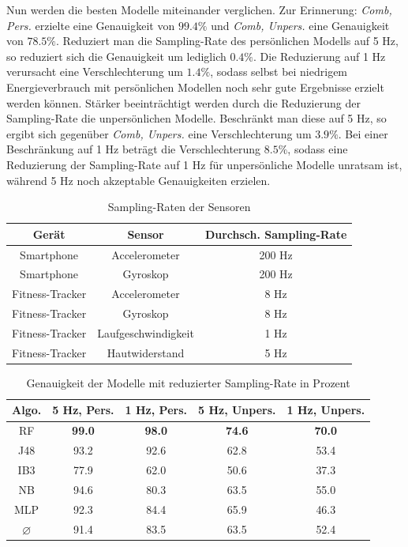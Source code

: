 Nun werden die besten Modelle miteinander verglichen. Zur Erinnerung: \textit{Comb, Pers.} erzielte eine Genauigkeit von $99.4 \%$ und \textit{Comb, Unpers.} eine Genauigkeit von $78.5 \%$. Reduziert man die Sampling-Rate des persönlichen Modells auf 5 Hz, so reduziert sich die Genauigkeit um lediglich $0.4 \%$. Die Reduzierung auf 1 Hz verursacht eine Verschlechterung um $1.4 \%$, sodass selbst bei niedrigem Energieverbrauch mit persönlichen Modellen noch sehr gute Ergebnisse erzielt werden können. Stärker beeinträchtigt werden durch die Reduzierung der Sampling-Rate die unpersönlichen Modelle. Beschränkt man diese auf 5 Hz, so ergibt sich gegenüber \textit{Comb, Unpers.} eine Verschlechterung um $3.9 \%$. Bei einer Beschränkung auf 1 Hz beträgt die Verschlechterung $8.5 \%$, sodass eine Reduzierung der Sampling-Rate auf 1 Hz für unpersönliche Modelle unratsam ist, während 5 Hz noch akzeptable Genauigkeiten erzielen.

\begin{table}
\centering
\begin{tabular}{|c|c|c|}
	\hline 
	\textbf{Gerät} & \textbf{Sensor} & \textbf{Durchsch. Sampling-Rate} \\ 
	\hline 
	Smartphone & Accelerometer & 200 Hz \\ 
	\hline 
	Smartphone & Gyroskop & 200 Hz \\ 
	\hline 
	Fitness-Tracker & Accelerometer & 8 Hz \\ 
	\hline 
	Fitness-Tracker & Gyroskop & 8 Hz \\ 
	\hline 
	Fitness-Tracker & Laufgeschwindigkeit & 1 Hz \\ 
	\hline 
	Fitness-Tracker & Hautwiderstand & 5 Hz \\ 
	\hline 
\end{tabular}
\caption{Sampling-Raten der Sensoren}
\label{tab:sampling-rates}
\end{table}

\begin{table}
\centering
\begin{tabular}{|c|c|c||c|c|}
	\hline 
	\textbf{Algo.} & \textbf{5 Hz, Pers.} & \textbf{1 Hz, Pers.} &\textbf{5 Hz, Unpers.} & \textbf{1 Hz, Unpers.} \\ 
	\hline 
	RF & \textbf{99.0} & \textbf{98.0} & \textbf{74.6} & \textbf{70.0} \\ 
	J48 & 93.2 & 92.6 & 62.8 & 53.4 \\ 
	IB3 & 77.9 & 62.0 & 50.6 & 37.3 \\ 
	NB & 94.6 & 80.3 & 63.5 & 55.0 \\ 
	MLP & 92.3 & 84.4 & 65.9 & 46.3 \\ 
	\hline 
	$\varnothing$ & 91.4 & 83.5 & 63.5 & 52.4 \\ 
	\hline
\end{tabular} 
\caption{Genauigkeit der Modelle mit reduzierter Sampling-Rate in Prozent}
\label{tab:accuracy-sampling_rate}
\end{table}

